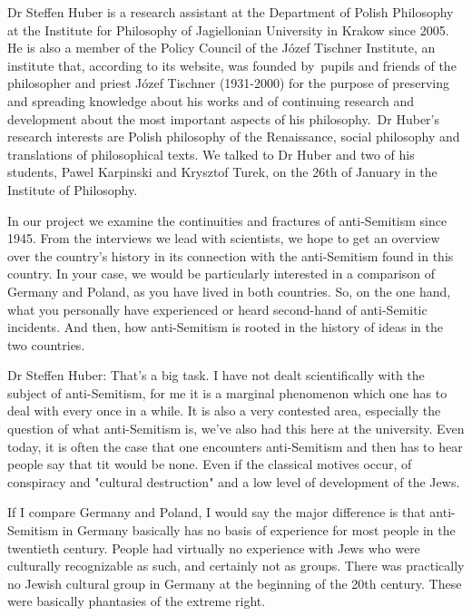 Dr Steffen Huber is a research assistant at the Department of Polish Philosophy at the Institute for Philosophy of Jagiellonian University in Krakow since 2005. He is also a member of the Policy Council of the Józef Tischner Institute, an institute that, according to its website, was founded by  pupils and friends of the philosopher and priest Józef Tischner (1931-2000) for the purpose of preserving and spreading knowledge about his works and of continuing research and development about the most important aspects of his philosophy.  
Dr Huber’s research interests are Polish philosophy of the Renaissance, social philosophy and translations of philosophical texts. We talked to Dr Huber and two of his students, Pawel Karpinski and Krysztof Turek, on the 26th of January in the Institute of Philosophy.  

In our project we examine the continuities and fractures of anti-Semitism since 1945. From the interviews we lead with scientists, we hope to get an overview over the country's history in its connection with the anti-Semitism found in this country. In your case, we would be particularly interested in a comparison of Germany and Poland, as you have lived in both countries. So, on the one hand, what you personally have experienced or heard second-hand of anti-Semitic incidents. And then, how anti-Semitism is rooted in the history of ideas in the two countries. 

 

Dr Steffen Huber: That's a big task. I have not dealt scientifically with the subject of anti-Semitism, for me it is a marginal phenomenon which one has to deal with every once in a while. It is also a very contested area, especially the question of what anti-Semitism is, we’ve also had this here at the university. Even today, it is often the case that one encounters anti-Semitism and then has to hear people say that tit would be none. Even if the classical motives occur, of conspiracy and "cultural destruction" and a low level of development of the Jews.  

If I compare Germany and Poland, I would say the major difference is that anti-Semitism in Germany basically has no basis of experience for most people in the twentieth century. People had virtually no experience with Jews who were culturally recognizable as such, and certainly not as groups. There was practically no Jewish cultural group in Germany at the beginning of the 20th century. These were basically phantasies of the extreme right. 

